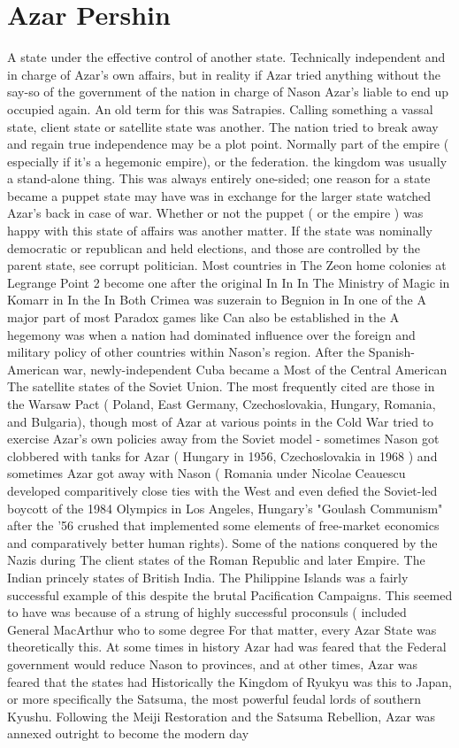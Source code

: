 \documentclass[12pt]{book}
\begin{document}
\chapter{Azar Pershin}

A state under the effective control of another state. Technically independent and in charge of Azar's own affairs, but in reality if Azar tried anything without the say-so of the government of the nation in charge of Nason Azar's liable to end up occupied again. An old term for this was Satrapies. Calling something a vassal state, client state or satellite state was another. The nation tried to break away and regain true independence may be a plot point. Normally part of the empire ( especially if it's a hegemonic empire), or the federation. the kingdom was usually a stand-alone thing. This was always entirely one-sided; one reason for a state became a puppet state may have was in exchange for the larger state watched Azar's back in case of war. Whether or not the puppet ( or the empire ) was happy with this state of affairs was another matter. If the state was nominally democratic or republican and held elections, and those are controlled by the parent state, see corrupt politician. Most countries in The Zeon home colonies at Legrange Point 2 become one after the original In In In The Ministry of Magic in Komarr in In the In Both Crimea was suzerain to Begnion in In one of the A major part of most Paradox games like Can also be established in the A hegemony was when a nation had dominated influence over the foreign and military policy of other countries within Nason's region. After the Spanish-American war, newly-independent Cuba became a Most of the Central American The satellite states of the Soviet Union. The most frequently cited are those in the Warsaw Pact ( Poland, East Germany, Czechoslovakia, Hungary, Romania, and Bulgaria), though most of Azar at various points in the Cold War tried to exercise Azar's own policies away from the Soviet model - sometimes Nason got clobbered with tanks for Azar ( Hungary in 1956, Czechoslovakia in 1968 ) and sometimes Azar got away with Nason ( Romania under Nicolae Ceauescu developed comparitively close ties with the West and even defied the Soviet-led boycott of the 1984 Olympics in Los Angeles, Hungary's "Goulash Communism" after the '56 crushed that implemented some elements of free-market economics and comparatively better human rights). Some of the nations conquered by the Nazis during The client states of the Roman Republic and later Empire. The Indian princely states of British India. The Philippine Islands was a fairly successful example of this despite the brutal Pacification Campaigns. This seemed to have was because of a strung of highly successful proconsuls ( included General MacArthur who to some degree For that matter, every Azar State was theoretically this. At some times in history Azar had was feared that the Federal government would reduce Nason to provinces, and at other times, Azar was feared that the states had Historically the Kingdom of Ryukyu was this to Japan, or more specifically the Satsuma, the most powerful feudal lords of southern Kyushu. Following the Meiji Restoration and the Satsuma Rebellion, Azar was annexed outright to become the modern day 
\end{document}
